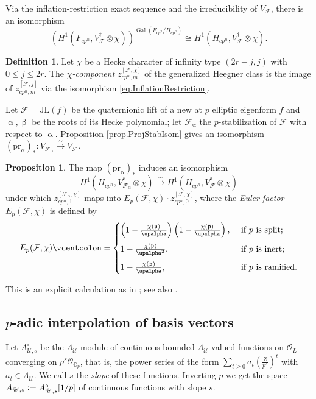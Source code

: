 \documentclass[a4paper]{amsart}
\numberwithin{equation}{section}
\theoremstyle{definition}
\newtheorem{proposition}[theorem]{Proposition}
\newtheorem{definition}[theorem]{Definition}
\newcommand{\C}{\mathbb{C}}
\newcommand{\defeq}{\vcentcolon=}
\DeclareMathOperator{\Gal}{Gal}
\begin{document}
Via the inflation-restriction exact sequence and the irreducibility of $V_\mathcal{F}$, there is an isomorphism 
\begin{equation}\label{eq.InflationRestriction}
\left(H^1(F_{cp^n},V_\mathcal{F}^\dagger\otimes\chi)\right)^{\Gal(F_{cp^n}/H_{cp^n})}\cong H^1(H_{cp^n},V_\mathcal{F}^\dagger\otimes\chi).
\end{equation}
\begin{definition}
Let $\chi$ be a Hecke character of infinity type $(2r-j,j)$ with $0\le j\le 2r$. The \emph{$\chi$-component} $z_{cp^n,m}^{[\mathcal{F},\chi]}$
of the generalized Heegner class is the image of $z_{cp^n,m}^{[\mathcal{F},j]}$ via the isomorphism \eqref{eq.InflationRestriction}.
\end{definition}

Let $\mathcal{F}=\mathrm{JL}(f)$ be the quaternionic lift of a new at $p$ elliptic eigenform $f$ and $\upalpha, \upbeta$ be the roots of its Hecke polynomial; let $\mathcal{F}_\upalpha$ the $p$-stabilization of $\mathcal{F}$ with respect to $\upalpha$. Proposition \ref{prop.ProjStabIsom} gives an isomorphism $(\mathrm{pr}_\upalpha)_*\colon V_{\mathcal{F}_\upalpha}\stackrel{\sim}{\to}V_{\mathcal{F}}$.

\begin{proposition}\label{prop.ProjStab}
The map $(\mathrm{pr}_\upalpha)_*$ induces an isomorphism \[H^1\left(H_{cp^n},V_{\mathcal{F}_\upalpha}^\ast\otimes\chi\right)\stackrel{\sim}{\longrightarrow} H^1\left(H_{cp^n},V_\mathcal{F}^\ast\otimes\chi\right)\] under which $z_{cp^n,1}^{[\mathcal{F}_\upalpha,\chi]}$ maps into $E_p(\mathcal{F},\chi)\cdot z_{cp^n,0}^{[\mathcal{F},\chi]}$, where the \textit{Euler factor} $E_p(\mathcal{F},\chi)$ is defined by \[E_p(\mathcal{F},\chi)\defeq\begin{cases}
\left(1-\frac{\chi(\mathfrak{p})}{\upalpha} \right)\medskip\left(1-\frac{\chi(\bar{\mathfrak{p}})}{\upalpha}\right), & \text{ if $p$ is split;}\\\medskip
1-\frac{\chi(\mathfrak{p})}{\upalpha^2}, & \text{ if $p$ is inert;}\\
1-\frac{\chi(\mathfrak{p})}{\upalpha}, &\text{ if $p$ is ramified.}
\end{cases}\]
\end{proposition}
This is an explicit calculation as in \cite[Theorem 5.7.6]{KingsLoefflerZerbes.ERL}; see also \cite[Proposition 3.5.5]{JetchevLoefflerZerbes}.

\subsection{$p$-adic interpolation of basis vectors}
Let $A_{\mathscr{U},s}^\circ$ be the $\Lambda_\mathscr{U}$-module of continuous bounded $\Lambda_\mathscr{U}$-valued functions on $\mathcal{O}_L$ converging on $p^s\mathcal{O}_{\C_p}$, that is, the power series of the form $\sum_{t\ge 0}a_t\left(\tfrac{Z}{p^s}\right)^t$ with $a_t\in\Lambda_\mathscr{U}$. We call $s$ the \textit{slope} of these functions. Inverting $p$ we get the space $A_{\mathscr{U},s}\defeq A_{\mathscr{U},s}^\circ[1/p]$ of continuous functions with slope $s$.
\end{document}
